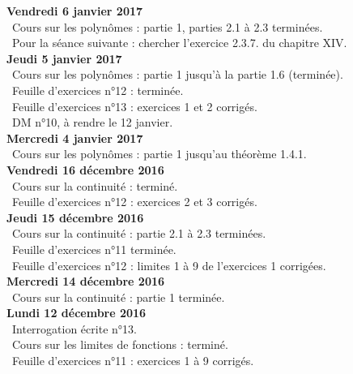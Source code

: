 \documentclass[12pt,a4paper]{article}
\begin{document}
\noindent\textbf{Vendredi 6 janvier 2017}\\
\bu\ Cours sur les polynômes : partie 1, parties 2.1 à 2.3 terminées.\\
\bu\ Pour la séance suivante : chercher l'exercice 2.3.7. du chapitre XIV.\vspace{.4cm}\\

\noindent\textbf{Jeudi 5 janvier 2017}\\
\bu\ Cours sur les polynômes : partie  1 jusqu'à la partie 1.6 (terminée).\\
\bu\ Feuille d'exercices n°12 : terminée.\\
\bu\ Feuille d'exercices n°13 : exercices 1 et 2 corrigés.\\
\bu\ DM n°10, à rendre le 12 janvier.\vspace{.4cm}\\

\noindent\textbf{Mercredi 4 janvier 2017}\\
\bu\ Cours sur les polynômes : partie  1 jusqu'au théorème 1.4.1.\vspace{.4cm}\\

\noindent\textbf{Vendredi 16 décembre 2016}\\
\bu\ Cours sur la continuité : terminé.\\
\bu\ Feuille d'exercices n°12 : exercices 2 et 3 corrigés.\vspace{.4cm}\\

\noindent\textbf{Jeudi 15 décembre 2016}\\
\bu\ Cours sur la continuité : partie 2.1 à 2.3 terminées.\\
\bu\ Feuille d'exercices n°11 terminée.\\
\bu\ Feuille d'exercices n°12 : limites 1 à 9 de l'exercices 1 corrigées.\vspace{.4cm}\\

\noindent\textbf{Mercredi 14 décembre 2016}\\
\bu\ Cours sur la continuité : partie 1 terminée. \vspace{.4cm}\\

\noindent\textbf{Lundi 12 décembre 2016}\\
\bu\ Interrogation écrite n°13.\\
\bu\ Cours sur les limites de fonctions : terminé.\\
\bu\ Feuille d'exercices n°11 : exercices 1 à 9 corrigés. \vspace{.4cm}\\
\end{document}
